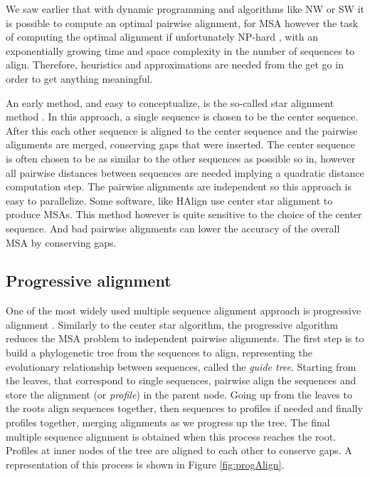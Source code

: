 \documentclass[
  11pt,
  twoside,
  BCOR=10mm,
  listof=totoc]{scrbook}
\begin{document}
We saw earlier that with dynamic programming and algorithms like NW or SW it is possible to compute an optimal pairwise alignment, for MSA however the task of computing the optimal alignment if unfortunately NP-hard \autocite{wangComplexityMultipleSequence1994,justComputationalComplexityMultiple2001}, with an exponentially growing time and space complexity in the number of sequences to align. Therefore, heuristics and approximations are needed from the get go in order to get anything meaningful.

An early method, and easy to conceptualize, is the so-called star alignment method \autocite{chaoDevelopmentsAlgorithmsSequence2022}. In this approach, a single sequence is chosen to be the center sequence. After this each other sequence is aligned to the center sequence and the pairwise alignments are merged, conserving gaps that were inserted. The center sequence is often chosen to be as similar to the other sequences as possible so in, however all pairwise distances between sequences are needed implying a quadratic distance computation step. The pairwise alignments are independent so this approach is easy to parallelize. Some software, like HAlign \autocite{tangHAlignFastMultiple2022} use center star alignment to produce MSAs. This method however is quite sensitive to the choice of the center sequence. And bad pairwise alignments can lower the accuracy of the overall MSA by conserving gaps.

\hypertarget{progressive-alignment}{%
\subsection{Progressive alignment}\label{progressive-alignment}}

One of the most widely used multiple sequence alignment approach is progressive alignment \autocite{fengProgressiveSequenceAlignment1987}. Similarly to the center star algorithm, the progressive algorithm reduces the MSA problem to independent pairwise alignments. The first step is to build a phylogenetic tree from the sequences to align, representing the evolutionary relationship between sequences, called the \emph{guide tree}. Starting from the leaves, that correspond to single sequences, pairwise align the sequences and store the alignment (or \emph{profile}) in the parent node. Going up from the leaves to the roots align sequences together, then sequences to profiles if needed and finally profiles together, merging alignments as we progress up the tree. The final multiple sequence alignment is obtained when this process reaches the root. Profiles at inner nodes of the tree are aligned to each other to conserve gaps. A representation of this process is shown in Figure \ref{fig:progAlign}.
\end{document}
